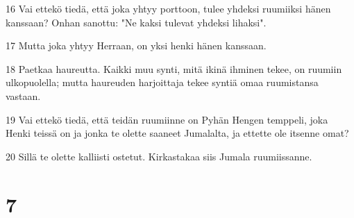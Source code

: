 \par 16 Vai ettekö tiedä, että joka yhtyy porttoon, tulee yhdeksi ruumiiksi hänen kanssaan? Onhan sanottu: "Ne kaksi tulevat yhdeksi lihaksi".
\par 17 Mutta joka yhtyy Herraan, on yksi henki hänen kanssaan.
\par 18 Paetkaa haureutta. Kaikki muu synti, mitä ikinä ihminen tekee, on ruumiin ulkopuolella; mutta haureuden harjoittaja tekee syntiä omaa ruumistansa vastaan.
\par 19 Vai ettekö tiedä, että teidän ruumiinne on Pyhän Hengen temppeli, joka Henki teissä on ja jonka te olette saaneet Jumalalta, ja ettette ole itsenne omat?
\par 20 Sillä te olette kalliisti ostetut. Kirkastakaa siis Jumala ruumiissanne.

\chapter{7}


